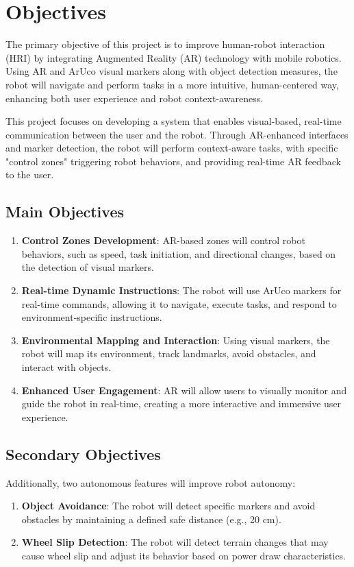 \section{\label{sec:objectives}Objectives}

The primary objective of this project is to improve human-robot interaction (HRI) by integrating Augmented Reality (AR) technology with mobile robotics. Using AR and ArUco visual markers along with object detection measures, the robot will navigate and perform tasks in a more intuitive, human-centered way, enhancing both user experience and robot context-awareness.

This project focuses on developing a system that enables visual-based, real-time communication between the user and the robot. Through AR-enhanced interfaces and marker detection, the robot will perform context-aware tasks, with specific "control zones" triggering robot behaviors, and providing real-time AR feedback to the user.

\subsection{Main Objectives}
\begin{enumerate}
	\item \textbf{Control Zones Development}: AR-based zones will control robot behaviors, such as speed, task initiation, and directional changes, based on the detection of visual markers.
	\item \textbf{Real-time Dynamic Instructions}: The robot will use ArUco markers for real-time commands, allowing it to navigate, execute tasks, and respond to environment-specific instructions.
	\item \textbf{Environmental Mapping and Interaction}: Using visual markers, the robot will map its environment, track landmarks, avoid obstacles, and interact with objects.
	\item \textbf{Enhanced User Engagement}: AR will allow users to visually monitor and guide the robot in real-time, creating a more interactive and immersive user experience.
\end{enumerate}

\subsection{Secondary Objectives}

Additionally, two autonomous features will improve robot autonomy:
\begin{enumerate}
	\item \textbf{Object Avoidance}: The robot will detect specific markers and avoid obstacles by maintaining a defined safe distance (e.g., 20 cm).
	\item \textbf{Wheel Slip Detection}: The robot will detect terrain changes that may cause wheel slip and adjust its behavior based on power draw characteristics.
\end{enumerate}


